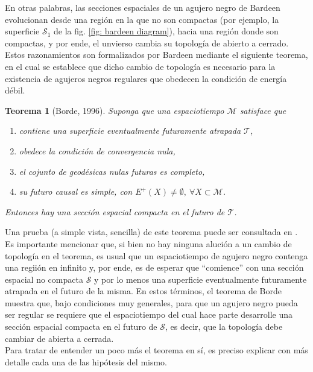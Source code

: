 \documentclass[16pt,a4paper]{article}
\numberwithin{equation}{section}
\newtheorem{theorem}{Teorema}[section]
\theoremstyle{definition}
\begin{document}
En otras palabras, las secciones espaciales de un agujero negro de Bardeen evolucionan desde una región en la que no son compactas (por ejemplo, la superficie $\mathcal{S}_{1}$ de la fig. \ref{fig: bardeen diagram}), hacia una región donde son compactas, y por ende, el unvierso cambia su topología de abierto a cerrado. Estos razonamientos son formalizados por Bardeen mediante el siguiente teorema, en el cual se establece que dicho cambio de topología es necesario para la existencia de agujeros negros regulares que obedecen la condición de energía débil.\\
\begin{theorem}[Borde, 1996]
	\label{borde reg thm}
	Suponga que una espaciotiempo $\mathcal{M}$ satisface que
	
	\begin{enumerate}[i]
		\item contiene una superficie eventualmente futuramente atrapada $\mathcal{T}$,
		
		\item obedece la condición de convergencia nula,
		
		\item el cojunto de geodésicas nulas futuras es completo,
		
		\item su futuro causal es simple, con $E^{+}(X) \neq \emptyset,\ \forall X \subset \mathcal{M}$.
	\end{enumerate}
	
	Entonces hay una sección espacial compacta en el futuro de $\mathcal{T}$.
\end{theorem}

Una prueba (a simple vista, sencilla) de este teorema puede ser consultada en \cite{borde1996}. Es importante mencionar que, si bien no hay ninguna alución a un cambio de topología en el teorema, es usual que un espaciotiempo de agujero negro contenga una regiión en infinito y, por ende, es de esperar que ``comience'' con una sección espacial no compacta $\mathcal{S}$ y por lo menos una superficie eventualmente futuramente atrapada en el futuro de la misma. En estos términos, el teorema de Borde muestra que, bajo condiciones muy generales, para que un agujero negro pueda ser regular se requiere que el espaciotiempo del cual hace parte desarrolle una sección espacial compacta en el futuro de $\mathcal{S}$, es decir, que la topología debe cambiar de abierta a cerrada.\\

Para tratar de entender un poco más el teorema en sí, es preciso explicar con más detalle cada una de las hipótesis del mismo.\\
\end{document}
